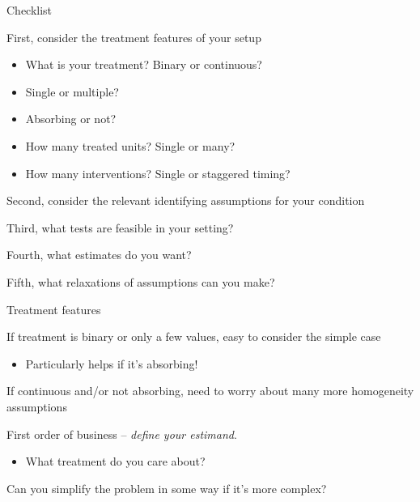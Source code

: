 \documentclass[notes,11pt, aspectratio=169]{beamer}
\newenvironment{wideitemize}{\itemize\addtolength{\itemsep}{10pt}}{\enditemize}
\begin{document}
\begin{frame}{Checklist}
  \begin{wideitemize}
  \item First, consider the treatment features of your setup
      \begin{itemize}
    \item What is your treatment? Binary or continuous?
    \item Single or multiple?
    \item Absorbing or not?
    \item How many treated units? Single or many?
    \item How many interventions? Single or staggered timing?
    \end{itemize}
  \item Second, consider the relevant identifying assumptions for your condition
  \item Third, what tests are feasible in your setting?
  \item Fourth, what estimates do you want?
  \item Fifth, what relaxations of assumptions can you make?
  \end{wideitemize}
\end{frame}

\begin{frame}{Treatment features}
  \begin{wideitemize}
  \item If treatment is binary or only a few values, easy to consider the simple case
    \begin{itemize}
    \item Particularly helps if it's absorbing!
    \end{itemize}
  \item If continuous and/or not absorbing, need to worry about many more homogeneity assumptions
  \item First order of business -- \emph{define your estimand}.
    \begin{itemize}
    \item What treatment do you care about?
    \end{itemize}
  \item Can you simplify the problem in some way if it's more complex?
  \end{wideitemize}
\end{frame}
\end{document}

